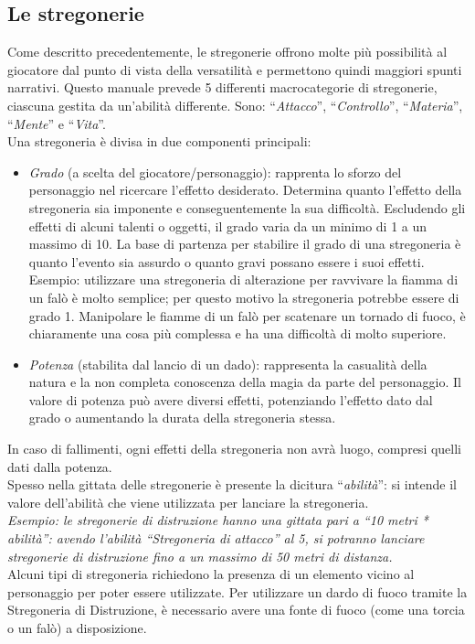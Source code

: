 \documentclass[../manuale_main.tex]{subfiles}
\begin{document}
\clearpage
\subsection{Le stregonerie}
Come descritto precedentemente, le stregonerie offrono molte più possibilità al giocatore dal punto di vista della versatilità e permettono quindi maggiori spunti narrativi.
Questo manuale prevede 5 differenti macrocategorie di stregonerie, ciascuna gestita da un'abilità differente.
Sono: ``\emph{Attacco}'', ``\emph{Controllo}'', ``\emph{Materia}'', ``\emph{Mente}'' e ``\emph{Vita}''.\\

Una stregoneria è divisa in due componenti principali:
\begin{itemize}
\item \emph{Grado} (a scelta del giocatore/personaggio): rapprenta lo sforzo del personaggio nel ricercare l'effetto desiderato. Determina quanto l'effetto della stregoneria sia imponente e conseguentemente la sua difficoltà. Escludendo gli effetti di alcuni talenti o oggetti, il grado varia da un minimo di 1 a un massimo di 10. La base di partenza per stabilire il grado di una stregoneria è quanto l’evento sia assurdo o quanto gravi possano essere i suoi effetti. Esempio: utilizzare una stregoneria di alterazione per ravvivare la fiamma di un falò è molto semplice; per questo motivo la stregoneria potrebbe essere di grado 1. Manipolare le fiamme di un falò per scatenare un tornado di fuoco, è chiaramente una cosa più complessa e ha una difficoltà di molto superiore.
\item \emph{Potenza} (stabilita dal lancio di un dado): rappresenta la casualità della natura e la non completa conoscenza della magia da parte del personaggio. Il valore di potenza può avere diversi effetti, potenziando l'effetto dato dal grado o aumentando la durata della stregoneria stessa.
\end{itemize}
In caso di fallimenti, ogni effetti della stregoneria non avrà luogo, compresi quelli dati dalla potenza.\\
Spesso nella gittata delle stregonerie è presente la dicitura ``\emph{abilità}'': si intende il valore dell'abilità che viene utilizzata per lanciare la stregoneria.\\
\emph{Esempio: le stregonerie di distruzione hanno una gittata pari a ``10 metri * abilità'': avendo l'abilità ``Stregoneria di attacco'' al 5, si potranno lanciare stregonerie di distruzione fino a un massimo di 50 metri di distanza.}\\
Alcuni tipi di stregoneria richiedono la presenza di un elemento vicino al personaggio per poter essere utilizzate. Per utilizzare un dardo di fuoco tramite la Stregoneria di Distruzione, è necessario avere una fonte di fuoco (come una torcia o un falò) a disposizione.
\end{document}

